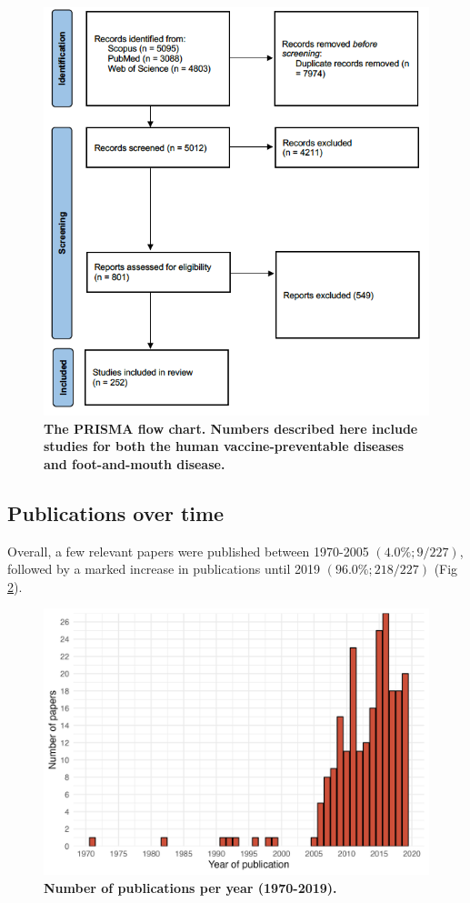 \documentclass[10pt,letterpaper]{article}
\begin{document}
\begin{figure}[h!]
	\includegraphics[scale=0.65]{figs/fig1_PRISMA_flowchart}
	\caption{\bf The PRISMA flow chart. Numbers described here include studies for both the human vaccine-preventable diseases and foot-and-mouth disease.}
	\label{fig:fig1prismaflowchart}
\end{figure}

\subsection*{Publications over time}
Overall, a few relevant papers were published between 1970-2005 $(4.0\%; 9/227)$, followed by a marked increase in publications until 2019 $(96.0\%; 218/227)$ (Fig \ref{publications_per_year}). 

\begin{figure}[!h]	
 \includegraphics[scale=0.70]{figs/fig2_publications_per_year.png}
	\caption{\bf Number of publications per year (1970-2019).}
	\label{publications_per_year}
\end{figure}
\end{document}
